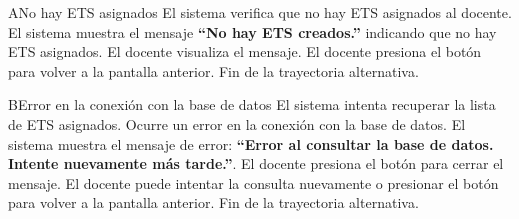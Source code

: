 \begin{UCtrayectoriaA}{A}{No hay ETS asignados}
	\UCpaso El sistema verifica que no hay ETS asignados al docente.
	\UCpaso El sistema muestra el mensaje \textbf{``No hay ETS creados.''} indicando que no hay ETS asignados.
	\UCpaso[\UCactor] El docente visualiza el mensaje.
	\UCpaso[\UCactor] El docente presiona el botón  para volver a la pantalla anterior.
	\UCpaso Fin de la trayectoria alternativa.
\end{UCtrayectoriaA}

\begin{UCtrayectoriaA}{B}{Error en la conexión con la base de datos}
	\UCpaso El sistema intenta recuperar la lista de ETS asignados.
	\UCpaso Ocurre un error en la conexión con la base de datos.
	\UCpaso El sistema muestra el mensaje de error: \textbf{``Error al consultar la base de datos. Intente nuevamente más tarde.''}.
	\UCpaso[\UCactor] El docente presiona el botón  para cerrar el mensaje.
	\UCpaso[\UCactor] El docente puede intentar la consulta nuevamente o presionar el botón  para volver a la pantalla anterior.
	\UCpaso Fin de la trayectoria alternativa.
\end{UCtrayectoriaA}

